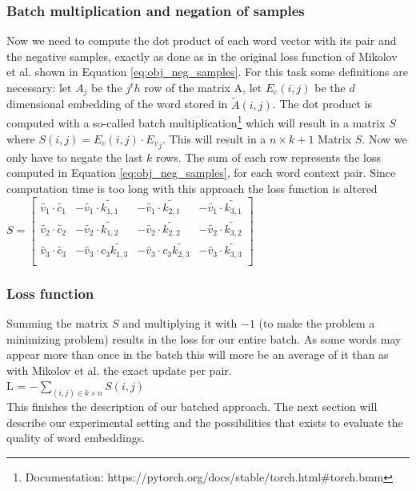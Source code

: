 \subsubsection{Batch multiplication and negation of samples}
Now we need to compute the dot product of each word vector with its pair and the negative samples, exactly as done as in the original loss function of Mikolov et al. shown in Equation \ref{eq:obj_neg_samples}. For this task some definitions are necessary: let $A_j$ be the $j^th$ row of the matrix A, let $E_c(i,j)$ be the $d$ dimensional embedding of the word stored in $\tilde{A}(i,j)$. The dot product is computed with a so-called batch multiplication\footnote{Documentation: https://pytorch.org/docs/stable/torch.html\#torch.bmm} which will result in a matrix $S$ where $S(i,j) = E_c(i,j) \cdot {E_v}_j$. This will result in a $n\times k+1$ Matrix $S$. Now we only have to negate the last $k$ rows. The sum of each row represents the loss computed in Equation \ref{eq:obj_neg_samples}, for each word context pair.
Since computation time is too long with this approach the loss function is altered\\

$S = \begin{bmatrix}
\tilde{v_1} \cdot \tilde{c_1} & -\tilde{v_1} \cdot \tilde{k_{1,1}} & -\tilde{v_1} \cdot \tilde{k_{2,1}}& -\tilde{v_1} \cdot \tilde{k_{3,1}}\\
\tilde{v_2} \cdot \tilde{c_2} & -\tilde{v_2} \cdot \tilde{k_{1,2}} & -\tilde{v_2} \cdot \tilde{k_{2,2}} & -\tilde{v_2} \cdot \tilde{k_{3,2}}\\
\tilde{v_3} \cdot \tilde{c_3} &-\tilde{v_3} \cdot c_3 \tilde{k_{1,3}} & -\tilde{v_3} \cdot c_3 \tilde{k_{2,3}}&-\tilde{v_3} \cdot \tilde{k_{3,3}}\\
\end{bmatrix}$\bigskip

\subsubsection{Loss function}
Summing the matrix $S$ and multiplying it with $-1$ (to make the problem a minimizing problem) results in the loss for our entire batch. As some words may appear more than once in the batch this will more be an average of it than as with Mikolov et al. \citep{mikolov2} the exact update per pair. \\
L = $- \sum_{(i,j) \in k \times n} S(i,j) $\\

This finishes the description of our batched approach. The next section will describe our experimental setting and the possibilities that exists to evaluate the quality of word embeddings. 
